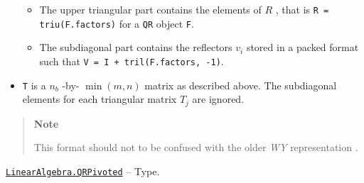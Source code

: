 \begin{adjustwidth}{2em}{0pt}
\begin{itemize}
\begin{itemize}
\item The upper triangular part contains the elements of  \(R\) , that is \texttt{R = triu(F.factors)} for a \texttt{QR} object \texttt{F}.


\item The subdiagonal part contains the reflectors  \(v_i\)  stored in a packed format such that \texttt{V = I + tril(F.factors, -1)}.

\end{itemize}

\item \texttt{T} is a  \(n_b\) -by- \(\min(m,n)\)  matrix as described above. The subdiagonal elements for each triangular matrix  \(T_j\)  are ignored.

\end{itemize}
\begin{quote}
\textbf{Note}

This format should not to be confused with the older \emph{WY} representation \footnotemark[2].

\end{quote}


\end{adjustwidth}
\hypertarget{1950169381798525185}{}
\hyperlink{1950169381798525185}{\texttt{LinearAlgebra.QRPivoted}}  -- {Type.}

